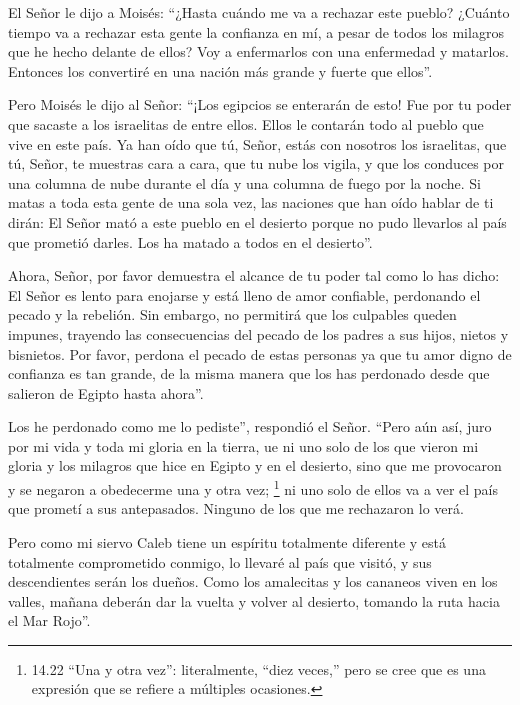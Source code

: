  El Señor le dijo a Moisés: ``¿Hasta cuándo me va a
rechazar este pueblo? ¿Cuánto tiempo va a rechazar esta gente la
confianza en mí, a pesar de todos los milagros que he hecho delante de
ellos?  Voy a enfermarlos con una enfermedad y matarlos.
Entonces los convertiré en una nación más grande y fuerte que ellos''.

 Pero Moisés le dijo al Señor: ``¡Los egipcios se enterarán
de esto! Fue por tu poder que sacaste a los israelitas de entre ellos.
 Ellos le contarán todo al pueblo que vive en este país. Ya
han oído que tú, Señor, estás con nosotros los israelitas, que tú,
Señor, te muestras cara a cara, que tu nube los vigila, y que los
conduces por una columna de nube durante el día y una columna de fuego
por la noche.  Si matas a toda esta gente de una sola vez,
las naciones que han oído hablar de ti dirán:  El Señor
mató a este pueblo en el desierto porque no pudo llevarlos al país que
prometió darles. Los ha matado a todos en el desierto''.

 Ahora, Señor, por favor demuestra el alcance de tu poder
tal como lo has dicho:  El Señor es lento para enojarse y
está lleno de amor confiable, perdonando el pecado y la rebelión. Sin
embargo, no permitirá que los culpables queden impunes, trayendo las
consecuencias del pecado de los padres a sus hijos, nietos y bisnietos.
 Por favor, perdona el pecado de estas personas ya que tu
amor digno de confianza es tan grande, de la misma manera que los has
perdonado desde que salieron de Egipto hasta ahora''.

 Los he perdonado como me lo pediste'', respondió el Señor.
 ``Pero aún así, juro por mi vida y toda mi gloria en la
tierra,  ue ni uno solo de los que vieron mi gloria y los
milagros que hice en Egipto y en el desierto, sino que me provocaron y
se negaron a obedecerme una y otra vez; \footnote{14.22 ``Una y otra
  vez'': literalmente, ``diez veces,'' pero se cree que es una expresión
  que se refiere a múltiples ocasiones.}  ni uno solo de
ellos va a ver el país que prometí a sus antepasados. Ninguno de los que
me rechazaron lo verá.

 Pero como mi siervo Caleb tiene un espíritu totalmente
diferente y está totalmente comprometido conmigo, lo llevaré al país que
visitó, y sus descendientes serán los dueños.  Como los
amalecitas y los cananeos viven en los valles, mañana deberán dar la
vuelta y volver al desierto, tomando la ruta hacia el Mar Rojo''.

